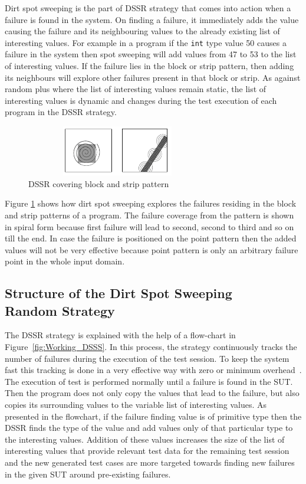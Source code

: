 \documentclass{acm_proc_article-sp}
\begin{document}
Dirt spot sweeping is the part of DSSR strategy that comes into action when a failure is found in the system. On finding a failure, it immediately adds the value causing the failure and its neighbouring values to the already existing list of interesting values. For example in a program if the \verb+int+ type value 50 causes a failure in the system then spot sweeping will add values from 47 to 53 to the list of interesting values. If the failure lies in the block or strip pattern, then adding its neighbours will explore other failures present in that block or strip. As against random plus where the list of interesting values remain static, the list of interesting values is dynamic and changes during the test execution of each program in the DSSR strategy.

\begin{figure}[ht]
\centering
\includegraphics[width=8cm,height=2.2cm]{block2.png}
\caption{DSSR covering block and strip pattern}
\label{fig:block2}
\end{figure}

Figure \ref{fig:block2} shows how dirt spot sweeping explores the failures residing in the block and strip patterns of a program. The failure coverage from the pattern is shown in spiral form because first failure will lead to second, second to third and so on till the end. In case the failure is positioned on the point pattern then the added values will not be very effective because point pattern is only an arbitrary failure point in the whole input domain.

\subsection{Structure of the Dirt Spot Sweeping \\ Random Strategy}

The DSSR strategy is explained with the help of a flow-chart in Figure~\ref{fig:Working_DSSS}. In this process, the strategy continuously tracks the number of failures during the execution of the test session. To keep the system fast this tracking is done in a very effective way with zero or minimum overhead~\cite{Leitner2009}. The execution of test is performed normally until a failure is found in the SUT. Then the program does not only copy the values that lead to the failure, but also copies its surrounding values to the variable list of interesting values. As presented in the flowchart, if the failure finding value is of primitive type then the DSSR finds the type of the value and add values only of that particular type to the interesting values. Addition of these values increases the size of the list of interesting values that provide relevant test data for the remaining test session and the new generated test cases are more targeted towards finding new failures in the given SUT around pre-existing failures.
\end{document}
